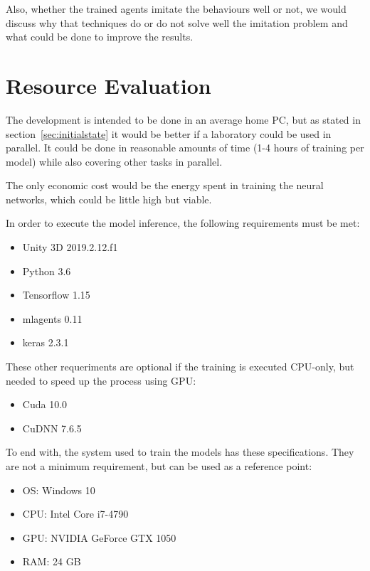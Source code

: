 Also, whether the trained agents imitate the behaviours well or not, we would discuss why that techniques do or do not solve well the imitation problem and what could be done to improve the results.

\section{Resource Evaluation}

The development is intended to be done in an average home PC, but as stated in section~\ref{sec:initialstate} it would be better if a laboratory could be used in parallel. It could be done in reasonable amounts of time (1-4 hours of training per model) while also covering other tasks in parallel.

The only economic cost would be the energy spent in training the neural networks, which could be little high but viable.

In order to execute the model inference, the following requirements must be met:

\begin{itemize}
 \item Unity 3D 2019.2.12.f1
 \item Python 3.6
 \item Tensorflow 1.15
 \item mlagents 0.11
 \item keras 2.3.1
\end{itemize}

These other requeriments are optional if the training is executed CPU-only, but needed to speed up the process using GPU:

\begin{itemize}
 \item Cuda 10.0
 \item CuDNN 7.6.5
\end{itemize}

To end with, the system used to train the models has these specifications. They are not a minimum requirement, but can be used as a reference point:

\begin{itemize}
 \item OS: Windows 10
 \item CPU: Intel Core i7-4790
 \item GPU: NVIDIA GeForce GTX 1050
 \item RAM: 24 GB
\end{itemize}
